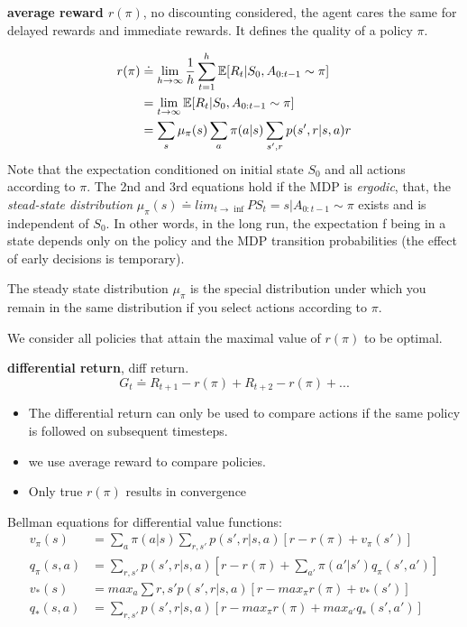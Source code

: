 \documentclass[sutton_barto_notes.tex]{subfiles}
\begin{document}
\begin{definition}
\textbf{average reward $r(\pi)$}, no discounting considered, the agent cares the same for delayed rewards and immediate rewards. It defines the quality of a policy $\pi$.
\end{definition}
\begin{align*}
r(\pi)&\doteq \lim_{h\to\infty} \frac{1}{h} \sum_{t=1}^h \operatorname*{\mathbb{E}}[R_t|S_0, A_{0:t-1} \sim \pi]\\
&=\lim_{t\to\infty}\operatorname*{\mathbb{E}}[R_t|S_0, A_{0:t-1} \sim \pi]\\
&=\sum_s \mu_\pi(s) \sum_a \pi(a|s) \sum_{s',r} p(s',r|s,a)r
\end{align*}
Note that the expectation conditioned on initial state $S_0$ and all actions according to $\pi$. The 2nd and 3rd equations hold if the MDP is \textit{ergodic}, that, the \textit{stead-state distribution} $\mu_\pi(s)\doteq lim_{t\rightarrow\inf}P{S_t=s|A_{0:t-1}\sim\pi}$ exists and is independent of $S_0$.
In other words, in the long run, the expectation f being in a state depends only on the policy and the MDP transition probabilities (the effect of early decisions is temporary).

The steady state distribution $\mu_\pi$ is the special distribution under which you remain in the same distribution if you select actions according to $\pi$.

We consider all policies that attain the maximal value of $r(\pi)$ to be optimal.

\begin{definition}
\textbf{differential return}, diff return.
$$G_t \doteq R_{t+1} - r(\pi) + R_{t+2} - r(\pi) + ...$$
\end{definition}
\begin{itemize}
\item The differential return can only be used to compare actions if the same policy is followed on subsequent timesteps.
\item we use average reward to compare policies.
\item Only true $r(\pi)$ results in convergence
\end{itemize}

Bellman equations for differential value functions:
\begin{align*}
v_\pi(s) &= \sum_a \pi(a|s)\sum_{r,s'}p(s',r|s,a)[r-r(\pi)+v_\pi(s')]\\
q_\pi(s,a)&=\sum_{r,s'}p(s',r|s,a)[r-r(\pi)+\sum_{a'}\pi(a'|s')q_\pi(s',a')]\\
v_*(s)&= max_a \sum{r,s'}p(s',r|s,a)[r-max_\pi r(\pi) + v_*(s')]\\
q_*(s,a) &= \sum_{r,s'}p(s',r|s,a)[r-max_\pi r(\pi) + max_{a'} q_*(s',a')]
\end{align*}
\end{document}
